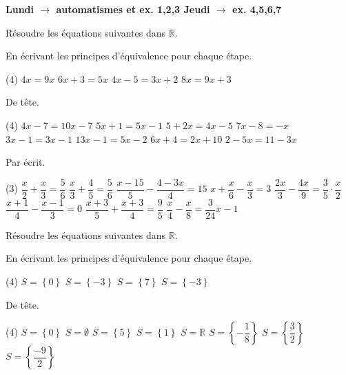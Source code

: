 \documentclass[a4paper,12pt]{report}
\begin{document}
{\bfseries Lundi $\longrightarrow$ automatismes et ex. 1,2,3  \hfill Jeudi $\longrightarrow$ ex. 4,5,6,7}


Résoudre les équations suivantes dans $\mathbb{R}$.

En écrivant les principes d'équivalence pour chaque étape.
	\begin{tasks}(4)
\task $4 x=9 x$
\task $6 x+3=5 x$
\task $4 x-5=3 x+2$
\task $8 x=9 x+3$
\end{tasks}
De tête.
\begin{tasks}(4)
\task $4 x-7=10 x-7$
\task $5 x+1=5 x-1$
\task $5+2 x=4 x-5$
\task $7 x-8=-x$
\task $3 x-1=3 x-1$
\task $13 x-1=5 x-2$
\task $6 x+4=2 x+10$
\task $2-5 x=11-3 x$
\end{tasks}

Par écrit.
	\begin{tasks}(3)
\task $\dfrac{x}{2}+\dfrac{x}{3}=\dfrac{5}{6}$
\task $\dfrac{x}{3}+\dfrac{4}{5}=\dfrac{5}{6}$
\task $\dfrac{x-15}{5}-\dfrac{4-3 x}{4}=15$
\task $x+\dfrac{x}{6}-\dfrac{x}{3}=3$
\task $\dfrac{2 x}{3}-\dfrac{4 x}{9}=\dfrac{3}{5} \cdot \dfrac{x}{2}$
\task $\dfrac{x+1}{4}-\dfrac{x-1}{3}=0$
\task $\dfrac{x+3}{5}+\dfrac{x+3}{4}=\dfrac{9}{5}$
\task $\dfrac{x}{4}-\dfrac{x}{8}=\dfrac{3}{24} x-1$
	\end{tasks}


\vspace{5pt}

Résoudre les équations suivantes dans $\mathbb{R}$.

En écrivant les principes d'équivalence pour chaque étape.
	\begin{tasks}(4)
		\task $S=\left\{0\right\}$
		\task $S=\left\{-3\right\}$
		\task $S=\left\{7\right\}$
		\task $S=\left\{-3\right\}$
\end{tasks}
De tête.
\begin{tasks}(4)
	\task $S=\left\{0\right\}$
\task $S=\emptyset$
\task $S=\left\{5\right\}$
\task $S=\left\{1\right\}$
\task $S=\mathbb{R}$
\task $S=\left\{-\dfrac{1}{8}\right\}$
\task $S=\left\{\dfrac{3}{2}\right\}$
\task $S=\left\{\dfrac{-9}{2}\right\}$
\end{tasks}
\end{document}
